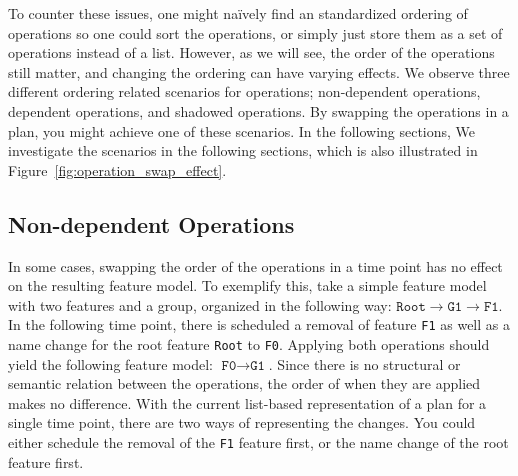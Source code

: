 \documentclass[a4paper,english]{ifimaster}
\begin{document}
To counter these issues, one might naïvely find an standardized ordering of operations so one could sort the operations, or simply just store them as a set of operations instead of a list. However, as we will see, the order of the operations still matter, and changing the ordering can have varying effects. We observe three different ordering related scenarios for operations; non-dependent operations, dependent operations, and shadowed operations. By swapping the operations in a plan, you might achieve one of these scenarios. In the following sections, We investigate the scenarios in the following sections, which is also illustrated in Figure~\ref{fig:operation_swap_effect}.

\subsection*{Non-dependent Operations}%
\label{sub:non_dependent_operations}

In some cases, swapping the order of the operations in a time point has no effect on the resulting feature model. To exemplify this, take a simple feature model with two features and a group, organized in the following way: $\texttt{Root} \rightarrow \texttt{G1} \rightarrow \texttt{F1}$. In the following time point, there is scheduled a removal of feature \texttt{F1} as well as a name change for the root feature \texttt{Root} to \texttt{F0}. Applying both operations should yield the following feature model: $\texttt{F0} \rightarrow \texttt{G1}$. Since there is no structural or semantic relation between the operations, the order of when they are applied makes no difference. With the current list-based representation of a plan for a single time point, there are two ways of representing the changes. You could either schedule the removal of the \texttt{F1} feature first, or the name change of the root feature first. 
\end{document}
